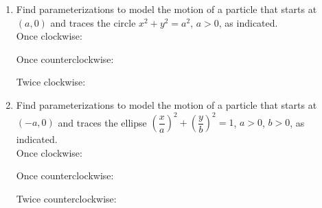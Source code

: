 \documentclass[11pt]{article}
\begin{document}
\begin{enumerate}
    \item Find parameterizations to model the motion of a particle that starts at $\displaystyle (a, 0)$ and traces the circle $\displaystyle x^2 + y^2 = a^2$, $a > 0$, as indicated.\\[1ex]

    \noindent Once clockwise:
    \vspace{13ex}

    \noindent Once counterclockwise:
    \vspace{13ex}

    \noindent Twice clockwise:
    \vspace{13ex}

    \item Find parameterizations to model the motion of a particle that starts at $\displaystyle (-a, 0)$ and traces the ellipse $\displaystyle \left(\dfrac{x}{a}\right)^2 + \left(\dfrac{y}{b}\right)^2 = 1$, $a > 0$, $b > 0$, as indicated.\\[1ex]

    \noindent Once clockwise:
    \vspace{13ex}

    \noindent Once counterclockwise:
    \vspace{13ex}

    \noindent Twice counterclockwise:
    \vspace{13ex}

    \end{enumerate}
\end{document}
